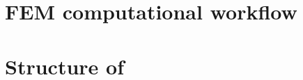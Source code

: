 \documentclass[12pt,a4paper,twoside]{article}
\begin{document}
\section{FEM computational workflow}

\section{Structure of \kratos}

% 
% 

\end{document}
